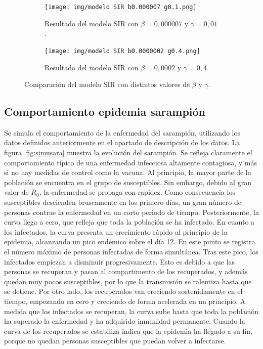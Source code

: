 \begin{figure}[H]
    \centering

    \begin{subfigure}[b]{0.9\linewidth}
        \centering
        \texttt{[image: img/modelo SIR b0.000007 g0.1.png]}
        \caption{Resultado del modelo SIR con $\beta = 0{,}000007$ y $\gamma = 0{,}01$.}
        \label{fig:simulacion1_SIR}
    \end{subfigure}

    \vspace{0.5cm}

    \begin{subfigure}[b]{0.9\linewidth}
        \centering
        \texttt{[image: img/modelo SIR b0.0000002 g0.4.png]}
        \caption{Resultado del modelo SIR con $\beta = 0{,}0002$ y $\gamma = 0{,}4$.}
        \label{fig:simulacion2_SIR}
    \end{subfigure}

    \caption{Comparación del modelo SIR con distintos valores de $\beta$ y $\gamma$.}
    \label{fig:comparacion_SIR}
\end{figure}










\subsection{Comportamiento epidemia sarampión}
Se simula el comportamiento de la enfermedad del sarampión, utilizando los datos definidos anteriormente en el apartado de descripción de los datos. La figura \ref{fig:simusara} muestra la evolución del sarampión. Se refleja claramente el comportamiento típico de una enfermedad infecciosa altamente contagiosa, y más si no hay medidas de control como la vacuna.
Al principio, la mayor parte de la población se encuentra en el grupo de susceptibles. Sin embargo, debido al gran valor de $R_0$, la enfermedad se propaga con rapidez. Como consecuencia los susceptibles descienden bruscamente en los primero días, un gran número de personas contrae la enfermedad en un corto periodo de tiempo. Posteriormente, la curva llega a cero, que refleja que toda la población se ha infectado.
En cuanto a los infectados, la curva presenta un crecimiento rápido al principio de la epidemia, alcanzando un pico endémico sobre el día 12. En este punto se registra el número máximo de personas infectadas de forma simultánea. Tras este pico, los infectados empiezan a disminuir progresivamente. Esto es debido a que las personas se recuperan y pasan al compartimento de los recuperados, y además quedan muy pocos susceptibles, por lo que la transmisión se ralentiza hasta que se detiene.
Por otro lado, los recuperados van creciendo sostenidamente en el tiempo, empezando en cero y creciendo de forma acelerada en un principio. A medida que los infectados se recuperan, la curva sube hasta que toda la población ha superado la enfermedad y ha adquirido inmunidad permanente. Cuando la curva de los recuperados se estabiliza indica que la epidemia ha llegado a su fin, porque no quedan personas susceptibles que puedan volver a infectarse.

